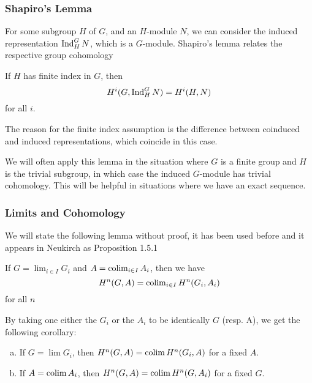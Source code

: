 \subsubsection{Shapiro's Lemma}

For some subgroup \(H\) of \(G\), and an \(H\)-module \(N\),
we can consider the induced representation
\(\operatorname{Ind}_{H}^{G} N\), which is a \(G\)-module.
Shapiro's lemma relates the respective group cohomology 

\begin{lemma}
	If \(H\) has finite index in \(G\), then 
	\[
		H^{i}(G,\operatorname{Ind}_{H}^{G} N) = H^{i}(H,N)
	\] 
	for all \(i\). 
\end{lemma}

\begin{remark}
	The reason for the finite index assumption is the 
	difference between coinduced and induced representations,
	which coincide in this case.
\end{remark}

We will often apply this lemma in the situation where
\(G\) is a finite group and \(H\) is the trivial subgroup,
in which case the induced \(G\)-module has trivial cohomology.
This will be helpful in situations where we have an exact sequence.

\subsubsection{Limits and Cohomology}

We will state the following lemma without proof, it has been used before
and it appears in Neukirch as Proposition 1.5.1

\begin{lemma}
	If \(G = \lim_{i \in I} G_{i}\) and \(A = \operatorname{colim}_{i \in I} A_{i}\),
	then we have 
	\[
		H^{n}(G,A) = \operatorname{colim}_{i \in I} H^{n}(G_{i},A_{i})
	\] 
	for all \(n\)
\end{lemma}

By taking one either the \(G_{i}\) or the \(A_{i}\) to be identically
\(G\) (resp. A), we get the following corollary:

\begin{corollary}\label{cor:lim:cohom}
	\begin{enumerate}[(a)]
		\item If \(G = \lim G_{i}\), then 
			\(H^{n}(G,A) = \operatorname{colim} H^{n}(G_{i},A)\) for a fixed \(A\).
		\item If \(A = \operatorname{colim} A_{i}\), then 
			\(H^{n}(G,A) = \operatorname{colim} H^{n}(G,A_{i})\) for a fixed \(G\).
	\end{enumerate}
\end{corollary}

